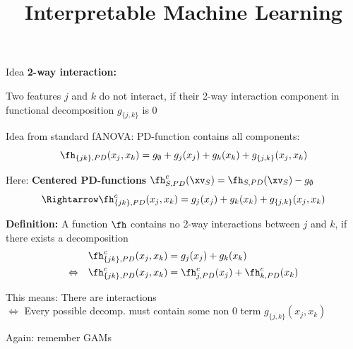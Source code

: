 \documentclass[10pt,compress,t,notes=noshow, xcolor=table]{beamer}
\title{Interpretable Machine Learning}
\begin{document}


\begin{framev}[align=top]{Idea }
\textbf{2-way interaction:}
\begin{itemizeM}
\item<+-> Two features $j$ and $k$ do not interact, if their 2-way interaction component in functional decomposition $g_{\{j,k\}}$ is 0
\item<+-> Idea from standard fANOVA: PD-function contains all components:
$$
\fh_{\{jk\}, PD}(x_j, x_k)
= g_\emptyset + g_j(x_j) + g_k(x_k) + g_{\{j,k\}}(x_j, x_k)
$$
\item<+-> Here: \textbf{Centered PD-functions} $\fh_{S,PD}^c(\xv_S) = \fh_{S,PD}(\xv_S) - g_\emptyset$
$$
\Rightarrow \fh^c_{\{jk\}, PD}(x_j, x_k)
= g_j(x_j) + g_k(x_k) + g_{\{j,k\}}(x_j, x_k)
$$
\item<+-> \textbf{Definition:} A function $\fh$ contains no 2-way interactions between $j$ and $k$, if there exists a decomposition
\begin{align*}
& \fh_{\{jk\}, PD}^c(x_j, x_k)
= g_j(x_j) + g_k(x_k) \\
\Leftrightarrow \quad
& \fh_{\{jk\}, PD}^c(x_j, x_k)
= \fh^c_{j, PD}(x_j) + \fh^c_{k, PD}(x_k)
\end{align*}
\item<+-> This means: There are interactions \\
$\Leftrightarrow$ Every possible decomp. must contain some non 0 term $g_{\{j,k\}}(x_j, x_k)$
\item<+-> Again: remember GAMs
\end{itemizeM}
\end{framev}
\end{document}

